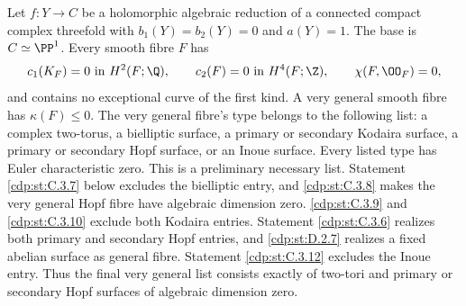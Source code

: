 \begin{proposition}\hypertarget{tag-01F4}{}\label{cdp:st:C.3.1}

Let $f:Y\to C$ be a holomorphic algebraic reduction of a connected
compact complex threefold with $b_1(Y)=b_2(Y)=0$ and $a(Y)=1$.
The base is $C\simeq\PP^1$. Every smooth fibre $F$ has
\[
 c_1(K_F)=0\text{ in }H^2(F;\Q),\qquad
 c_2(F)=0\text{ in }H^4(F;\Z),\qquad
 \chi(F,\OO_F)=0,
\]
and contains no exceptional curve of the first kind. A very general
smooth fibre has $\kappa(F)\leq0$. The very general fibre's type belongs to the following
list: a complex two-torus, a bielliptic surface, a primary or secondary
Kodaira surface, a primary or secondary Hopf surface, or an Inoue
surface. Every listed type has Euler characteristic zero. This is a
preliminary necessary list. Statement \ref{cdp:st:C.3.7} below excludes the
bielliptic entry, and \ref{cdp:st:C.3.8} makes the very general Hopf fibre have
algebraic dimension zero. \ref{cdp:st:C.3.9} and \ref{cdp:st:C.3.10} exclude both Kodaira
entries. Statement \ref{cdp:st:C.3.6} realizes both primary and secondary Hopf
entries, and \ref{cdp:st:D.2.7} realizes a fixed abelian surface as general
fibre. Statement \ref{cdp:st:C.3.12} excludes the Inoue entry. Thus the
final very general list consists exactly of two-tori and
primary or secondary Hopf surfaces of algebraic dimension zero.
\end{proposition}



